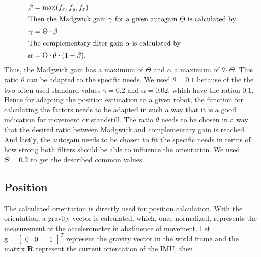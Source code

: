 \documentclass[letterpaper, 10 pt, conference]{ieeeconf}  %
\newcommand{\M}[1]{\mathbf{#1}} %
\newcommand{\V}[1]{\mathbf{#1}} %
\begin{document}
\begin{align}
\beta &= \max(f_x,f_y,f_z)\label{eq:weight_autogain}\\
\intertext{Then the Madgwick gain $\gamma$ for a given autogain $\Theta$ is calculated by} 
\gamma &= \Theta \cdot \beta \\
\intertext{The complementary filter gain $\alpha$ is calculated by}
\alpha &= \Theta \cdot \theta \cdot(1-\beta).
\end{align}
Thus, the Madgwick gain has a maximum of $\Theta$ and $\alpha$ a maximum of $\theta\cdot \Theta$. This ratio $\theta$ can be adapted to the specific needs.
We used $\theta = 0.1$ because of the the two often used standard values $\gamma = 0.2$ and $\alpha= 0.02$, which have the ration $0.1$.
Hence for adapting the position estimation to a given robot, the function for calculating the factors needs to be adapted in such a way that it is a good indication for movement or standstill.
The ratio $\theta$ needs to be chosen in a way that the desired ratio between Madgwick and complementary gain is reached.
And lastly, the autogain needs to be chosen to fit the specific needs in terms of how strong both filters should be able to influence the orientation.
We used $\Theta = 0.2$ to get the described common values.


\subsection{Position}
The calculated orientation is directly used for position calculation.
With the orientation, a gravity vector is calculated, which, once normalized, represents the measurement of the accelerometer in abstinence of movement. 
Let $\V g=\begin{bmatrix}0 &0 & -1 \end{bmatrix}^T$ represent the gravity vector in the world frame and the matrix $\M R$ represent the current orientation of the IMU, then
\end{document}
